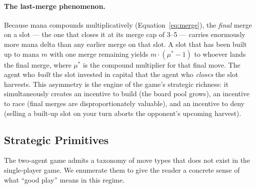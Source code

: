 \documentclass[11pt]{article}
\begin{document}
\paragraph{The last-merge phenomenon.} Because mana compounds
multiplicatively (Equation~\ref{eq:merge}), the \emph{final} merge on a
slot --- the one that closes it at its merge cap of 3--5 --- carries
enormously more mana delta than any earlier merge on that slot. A slot
that has been built up to mana $m$ with one merge remaining yields
$m \cdot (\mu^* - 1)$ to whoever lands the final merge, where
$\mu^*$ is the compound multiplier for that final move. The agent who
\emph{built} the slot invested in capital that the agent who
\emph{closes} the slot harvests. This asymmetry is the engine of the
game's strategic richness: it simultaneously creates an incentive to
build (the board pool grows), an incentive to race (final merges are
disproportionately valuable), and an incentive to deny (selling a
built-up slot on your turn aborts the opponent's upcoming harvest).

\subsection{Strategic Primitives}
\label{sec:ma-primitives}

The two-agent game admits a taxonomy of move types that does not exist in
the single-player game. We enumerate them to give the reader a concrete
sense of what ``good play'' means in this regime.
\end{document}
